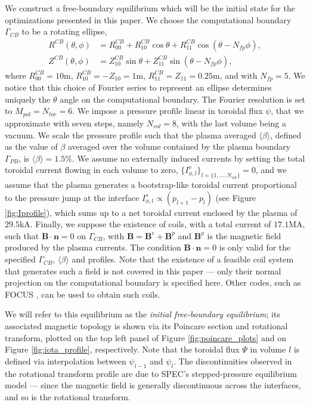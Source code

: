 \documentclass[my_thesis.tex]{subfiles}
\begin{document}
We construct a free-boundary equilibrium which will be the initial state for the optimizations presented in this paper. We choose the computational boundary $\Gamma_{CB}$ to be a rotating ellipse, 
\begin{align}
    R^{CB}(\theta,\phi) &= R^{CB}_{00} + R^{CB}_{10}\cos\theta + R^{CB}_{11}\cos(\theta-N_{fp}\phi), \label{eq.rotellipse1}\\
    Z^{CB}(\theta,\phi) &= Z^{CB}_{10}\sin\theta + Z^{CB}_{11}\sin(\theta-N_{fp}\phi),\label{eq.rotellipse2}
\end{align}
where $R^{CB}_{00}=10$m, $R^{CB}_{10}=-Z_{10}=1$m, $R^{CB}_{11}=Z_{11}=0.25$m, and with $N_{fp}=5$.  We notice that this choice of Fourier series to represent an ellipse determines uniquely the $\theta$ angle on the computational boundary. The Fourier resolution is set to $M_{pol}=N_{tor}=6$. We impose a pressure profile linear in toroidal flux $\psi$, that we approximate with seven steps, namely $N_{vol}=8$, with the last volume being a vacuum. We scale the pressure profile such that the plasma averaged $\langle\beta\rangle$, defined as the value of $\beta$ averaged over the volume contained by the plasma boundary $\Gamma_{PB}$, is $\langle\beta\rangle=1.5\%$. We assume no externally induced currents by setting the total toroidal current flowing in each volume to zero, $\{I^v_{\phi,l}\}_{l=\{1,\ldots,N_{vol}\}}=0$, and we assume that the plasma generates a bootstrap-like toroidal current proportional to the pressure jump at the interface  $I^s_{\phi,l}\propto (p_{l+1}-p_l)$ (see Figure \ref{fig:Iprofile}), which sums up to a net toroidal current enclosed by the plasma of $29.5$kA. Finally, we suppose the existence of coils, with a total current of $17.1$MA, such that $\mathbf{B}\cdot\mathbf{n}=0$ on $\Gamma_{CB}$, with $\mathbf{B}=\mathbf{B}^c+\mathbf{B}^p$ and $\mathbf{B}^p$ is the magnetic field produced by the plasma currents. The condition $\mathbf{B}\cdot\mathbf{n}=0$ is only valid for the specified $\Gamma_{CB}$, $\langle\beta\rangle$ and profiles. Note that the existence of a feasible coil system that generates such a field is not covered in this paper --- only their normal projection on the computational boundary is specified here. Other codes, such as \ac{FOCUS} \citep{Zhu2018a}, can be used to obtain such coils.  

We will refer to this equilibrium as the \emph{initial free-boundary equilibrium}; its associated magnetic topology is shown via its Poincare section and rotational transform, plotted on the top left panel of Figure \ref{fig:poincare_plots} and on Figure \ref{fig:iota_profile}, respectively. Note that the toroidal flux $\Psi$ in volume $l$ is defined via interpolation between $\psi_{l-1}$ and $\psi_l$. The discontinuities observed in the rotational transform profile are due to \ac{SPEC}'s stepped-pressure equilibrium model --- since the magnetic field is generally discontinuous across the interfaces, and so is the rotational transform.
\end{document}
